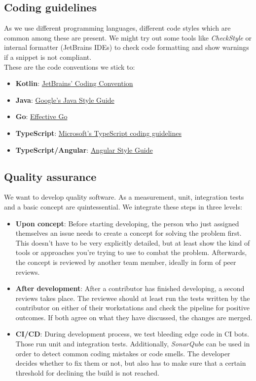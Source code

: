 \documentclass[a4paper,12pt,chapterprefix=false,bibliography=totoc,listof=totoc,]{scrreprt}
\begin{document}
\subsection{Coding guidelines}
As we use different programming languages, different code styles which are common among these are present. We might try out some tools like \emph{CheckStyle} or internal formatter (JetBrains IDEs) to check code formatting and show warnings if a snippet is not compliant. \\

These are the code conventions we stick to:
\begin{itemize}
	\item \textbf{Kotlin}: \href{https://kotlinlang.org/docs/reference/coding-conventions.html}{JetBrains' Coding Convention}
	\item \textbf{Java}: \href{https://google.github.io/styleguide/javaguide.html}{Google's Java Style Guide}
	\item \textbf{Go}: \href{https://golang.org/doc/effective_go.html}{Effective Go}
	\item \textbf{TypeScript}: \href{https://github.com/microsoft/TypeScript/wiki/Coding-guidelines}{Microsoft's TypeScript coding guidelines}
	\item \textbf{TypeScript/Angular}: \href{https://angular.io/guide/styleguide}{Angular Style Guide}
\end{itemize}

\subsection{Quality assurance}
We want to develop quality software. As a measurement, unit, integration tests and a basic concept are quintessential. We integrate these steps in three levels:
\begin{itemize}
	\item \textbf{Upon concept}: Before starting developing, the person who just assigned themselves an issue needs to create a concept for solving the problem first. This doesn't have to be very explicitly detailed, but at least show the kind of tools or approaches you're trying to use to combat the problem. Afterwards, the concept is reviewed by another team member, ideally in form of peer reviews.
	\item \textbf{After development}: After a contributor has finished developing, a second reviews takes place. The reviewee should at least run the tests written by the contributor on either of their workstations and check the pipeline for positive outcomes. If both agree on what they have discussed, the changes are merged.
	\item \textbf{CI/CD}: During development process, we test bleeding edge code in CI bots. Those run unit and integration tests. Additionally, \emph{SonarQube} can be used in order to detect common coding mistakes or code smells. The developer decides whether to fix them or not, but also has to make sure that a certain threshold for declining the build is not reached.
\end{itemize}
\end{document}
